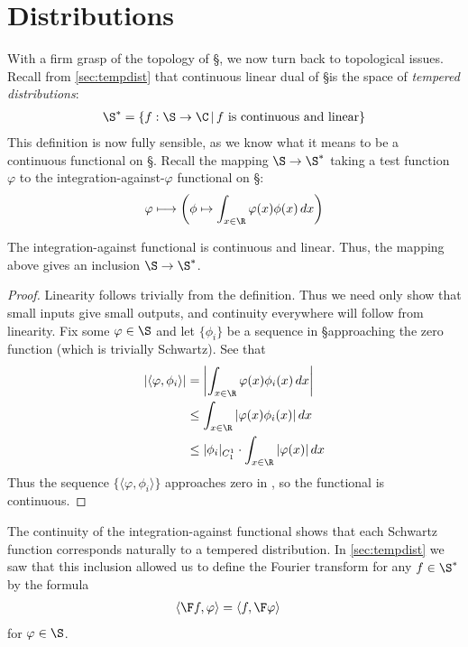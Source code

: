
  \chapter{Distributions}
  \label{ch:dist}
  
  With a firm grasp of the topology of \S, we now turn back to topological issues.
  Recall from \autoref{sec:tempdist} that continuous linear dual of \S is the space of \emph{tempered distributions}:
  \begin{align*}
    \S^* = \{f:\S\rightarrow\C\,\vert\,f\text{ is continuous and linear}\}
  \end{align*}
  This definition is now fully sensible, as we know what it means to be a continuous functional on \S.
  Recall the mapping $\S\rightarrow\S^*$ taking a test function $\varphi$ to the integration-against-$\varphi$ functional on \S:
  \begin{align*}
    \varphi \longmapsto \left( \phi \mapsto \int_{x\in\R} \varphi(x) \phi(x)\,dx \right)
  \end{align*}
  \begin{thm}
    The integration-against functional is continuous and linear.
    Thus, the mapping above gives an inclusion $\S\rightarrow\S^*$.
  \end{thm}
  \begin{proof}
    Linearity follows trivially from the definition.
    Thus we need only show that small inputs give small outputs, and continuity everywhere will follow from linearity.
    Fix some $\varphi\in\S$ and let $\{\phi_i\}$ be a sequence in \S approaching the zero function (which is trivially Schwartz).
    See that
    \begin{align*}
      |\langle\varphi,\phi_i\rangle| 
      &= \left|\int_{x\in\R} \varphi(x)\phi_i(x)\,dx\right|
      \\&\le \int_{x\in\R}| \varphi(x)\phi_i(x)|\,dx
      \\&\le |\phi_i|_{C^1_1}\cdot\int_{x\in\R}|\varphi(x)|\,dx
    \end{align*}
    Thus the sequence $\{\langle\varphi,\phi_i\rangle\}$ approaches zero in \C, so the functional is continuous.
  \end{proof}

  The continuity of the integration-against functional shows that each Schwartz function corresponds naturally to a tempered distribution.
  In \autoref{sec:tempdist} we saw that this inclusion allowed us to define the Fourier transform for any $f\in\S^*$ by the formula
  \begin{align*}
    \langle\F f, \varphi\rangle &= \langle f, \F\varphi\rangle
  \end{align*}
  for $\varphi\in\S$.
  
